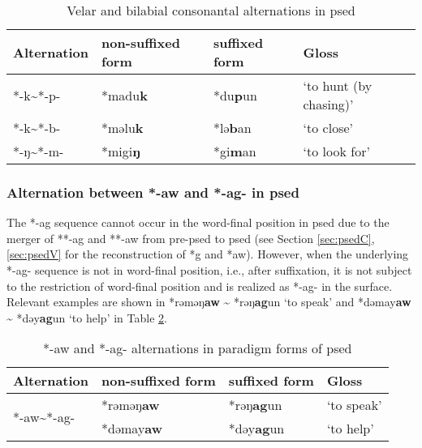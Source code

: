 \begin{table}[!htbp]
\centering
\caption{Velar and bilabial consonantal alternations in \acl{psed}}
\label{tab:psed_lab_vel}
\begin{tabular}{llll}
\hline
Alternation & non-suffixed form & suffixed form & Gloss                  \\ \hline
*-k\~{ }*-p-     & *madu\textbf{k}  & *du\textbf{p}un       & `to hunt (by chasing)' \\
*-k\~{ }*-b-     & *məlu\textbf{k}  & *lə\textbf{b}an       & `to close'             \\
*-ŋ\~{ }*-m-     & *migi\textbf{ŋ}  & *gi\textbf{m}an       & `to look for'          \\ \hline
\end{tabular}
\end{table}

\subsubsection{Alternation between *-aw and *-ag- in \acl{psed}}

The *-ag sequence cannot occur in the word-final position in \acl{psed} due to the merger of **-ag and **-aw from pre-\acl{psed} to \acl{psed}  (see Section \ref{sec:psedC}, \ref{sec:psedV} for the reconstruction of *g and *aw). However, when the underlying *-ag- sequence is not in word-final position, i.e., after suffixation, it is not subject to the restriction of word-final position and is realized as *-ag- in the surface. Relevant examples are shown in *rəməŋ\textbf{aw} \~{} *rəŋ\textbf{ag}un `to speak' and  *dəmay\textbf{aw} \~{} *dəy\textbf{ag}un `to help' in Table \ref{tab:psed_agaw}.

\begin{table}[!htbp]
\centering
\caption{*-aw and *-ag- alternations in paradigm forms of \acl{psed}}
\label{tab:psed_agaw}
\begin{tabular}{llll}
\hline
Alternation                      & non-suffixed form  & suffixed form & Gloss                   \\ \hline
\multirow{2}{*}{*-aw\~{ }*-ag-}  & *rəməŋ\textbf{aw} & *rəŋ\textbf{ag}un     & `to speak'               \\
                                & *dəmay\textbf{aw} & *dəy\textbf{ag}un     & `to help' \\ \hline
\end{tabular}
\end{table}

